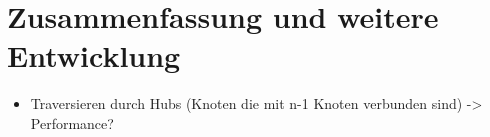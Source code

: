 \chapter{Zusammenfassung und weitere Entwicklung}
\label{cha:Fazit}

\begin{itemize}
	\item Traversieren durch Hubs (Knoten die mit n-1 Knoten verbunden sind) -> Performance?
\end{itemize}